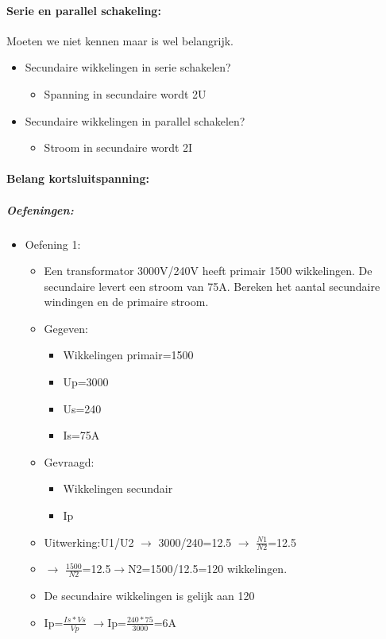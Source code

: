 \documentclass[12pt]{article}
\begin{document}
\paragraph{Serie en parallel schakeling:}
Moeten we niet kennen maar is wel belangrijk.\begin{itemize}
    \item Secundaire wikkelingen in serie schakelen?\begin{itemize}
        \item Spanning in secundaire wordt 2U
    \end{itemize}
    \item Secundaire wikkelingen in parallel schakelen?\begin{itemize}
        \item Stroom in secundaire wordt 2I
    \end{itemize}
\end{itemize}
\paragraph{Belang kortsluitspanning:}
\subparagraph{Oefeningen:}
\begin{itemize}
    \item Oefening 1:\begin{itemize}
        \item Een transformator 3000V/240V heeft primair 1500 wikkelingen. De secundaire levert
        een stroom van 75A. Bereken het aantal secundaire windingen en de primaire stroom.
        \item Gegeven:\begin{itemize}
            \item Wikkelingen primair=1500
            \item Up=3000 
            \item Us=240 
            \item Is=75A
        \end{itemize}
        \item Gevraagd:\begin{itemize}
            \item Wikkelingen secundair 
            \item Ip
        \end{itemize}
        \item Uitwerking:U1/U2 $\rightarrow$ 3000/240=12.5 $\rightarrow$ $\frac{N1}{N2}$=12.5
        \item $\rightarrow$ $\frac{1500}{N2}$=12.5$\rightarrow$N2=1500/12.5=120 wikkelingen.
        \item De secundaire wikkelingen is gelijk aan 120
        \item Ip=$\frac{Is*Vs}{Vp}$ $\rightarrow$Ip=$\frac{240*75}{3000}$=6A
    \end{itemize}
\end{itemize}
\end{document}
